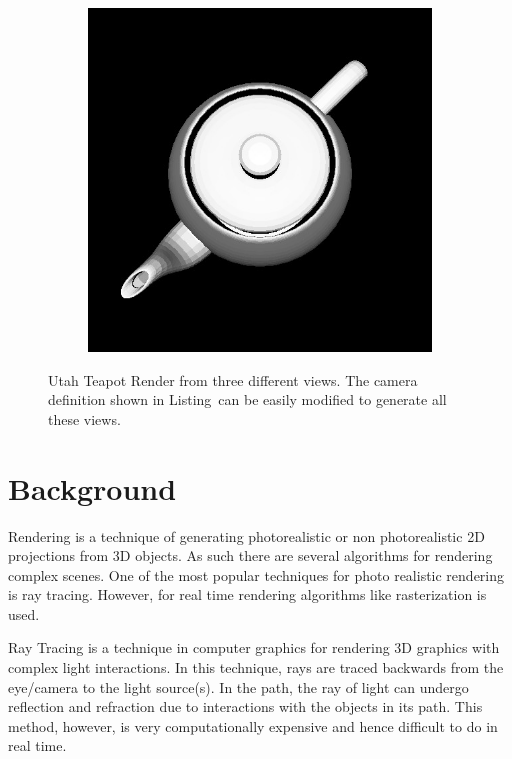 \documentclass{juliacon}
\begin{document}
\begin{figure}[!htb]
\begin{subfigure}[b]{0.3\textwidth}
        \caption*{}
    \end{subfigure}
    \hfill
    \begin{subfigure}[b]{0.3\textwidth}
        \centering
        \includegraphics[width=\textwidth]{images/render/teapot_top.jpg}
        \caption*{}
    \end{subfigure}
    \caption{Utah Teapot Render from three different views. The camera definition shown in Listing~\protect[\ref{lst:example_render}] can be easily modified to generate all these views.}
    \label{fig:teapot_render}
\end{figure}

\section{Background}
\label{sec:rendering}

Rendering is a technique of generating photorealistic or non photorealistic 2D projections from 3D objects. As such there are several algorithms for rendering complex scenes. One of the most popular techniques for photo realistic rendering is ray tracing. However, for real time rendering algorithms like rasterization is used.

Ray Tracing is a technique in computer graphics for rendering 3D graphics with complex light interactions. In this technique, rays are traced backwards from the eye/camera to the light source(s). In the path, the ray of light can undergo reflection and refraction due to interactions with the objects in its path. This method, however, is very computationally expensive and hence difficult to do in real time.
\end{document}
